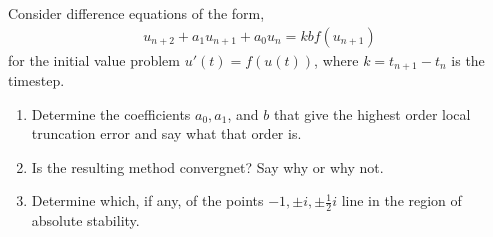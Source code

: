 \documentclass[10pt]{article}
\begin{document}
\begin{problem}
Consider difference equations of the form,
\begin{align*}
    u_{n+2} + a_1 u_{n+1}+a_0 u_n = kbf(u_{n+1})
\end{align*}
for the initial value problem \( u'(t) = f(u(t)) \), where \( k = t_{n+1} - t_n \) is the timestep.

\begin{enumerate}[label=(\alph*),nolistsep]
    \item Determine the coefficients \( a_0, a_1 \), and \( b \) that give the highest order local truncation error and say what that order is.
    \item Is the resulting method convergnet? Say why or why not.
    \item Determine which, if any, of the points \( -1,\pm i, \pm\frac{1}{2} i \) line in the region of absolute stability.
\end{enumerate}
\end{problem}
\end{document}
